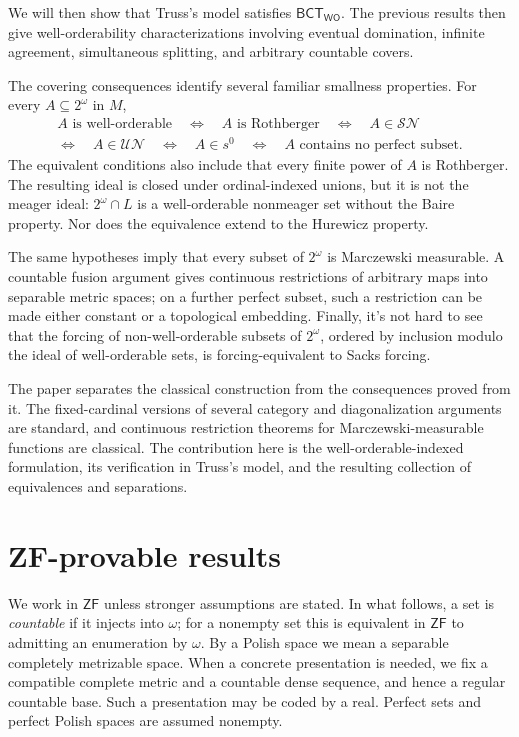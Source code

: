 \documentclass[11pt,reqno]{amsart}
\newcommand{\WO}{\mathsf{WO}}
\newcommand{\SN}{\mathcal{SN}}
\newcommand{\UN}{\mathcal{UN}}
\newcommand{\Mar}{s^0}
\newcommand{\BCTWO}{\mathsf{BCT}_{\WO}}
\theoremstyle{plain}
\theoremstyle{definition}
\theoremstyle{remark}
\begin{document}
We will then show that Truss's model satisfies $\BCTWO$.  The previous results then give well-orderability characterizations involving eventual domination, infinite agreement, simultaneous splitting, and arbitrary countable covers.  

The covering consequences identify several familiar smallness properties.
For every $A\subseteq2^\omega$ in $M$,
\begin{equation}\label{eq:intro-smallness}
 \begin{gathered}
  A\text{ is well-orderable}
  \quad\Longleftrightarrow\quad A\text{ is Rothberger}
  \quad\Longleftrightarrow\quad A\in\SN\\
  \Longleftrightarrow\quad A\in\UN
  \quad\Longleftrightarrow\quad A\in\Mar
  \quad\Longleftrightarrow\quad A\text{ contains no perfect subset}.
 \end{gathered}
\end{equation}
The equivalent conditions also include that every finite power of $A$ is Rothberger.  The resulting ideal is closed under ordinal-indexed unions, but it is not the meager ideal: $2^\omega\cap L$ is a well-orderable nonmeager set without the Baire property.  Nor does the equivalence extend to the
Hurewicz property.

The same hypotheses imply that every subset of $2^\omega$ is Marczewski measurable. A countable fusion argument gives continuous restrictions of arbitrary maps into separable metric spaces; on a further perfect subset, such a restriction can be made either constant or a topological embedding. Finally, it's not hard to see that the forcing of non-well-orderable subsets of $2^\omega$, ordered by inclusion modulo the ideal of well-orderable sets, is forcing-equivalent to Sacks forcing.

The paper separates the classical construction from the consequences proved from it.  The fixed-cardinal versions of several category and diagonalization arguments are standard, and continuous restriction theorems for Marczewski-measurable functions are classical.  The contribution here is the well-orderable-indexed formulation, its verification in Truss's model, and the resulting collection of equivalences and separations.

\section{ZF-provable results}\label{sec:abstract}

We work in $\mathsf{ZF}$ unless stronger assumptions are stated.  In what follows, a set is \emph{countable} if it injects into $\omega$; for a nonempty set this is equivalent in $\mathsf{ZF}$ to admitting an enumeration by $\omega$.  By a Polish space we mean a separable completely metrizable space.  When a concrete presentation is needed, we fix a compatible complete metric and a countable dense sequence, and hence a regular countable base.  Such a presentation may be coded by a real. Perfect sets and perfect Polish spaces are assumed nonempty. 
\end{document}
